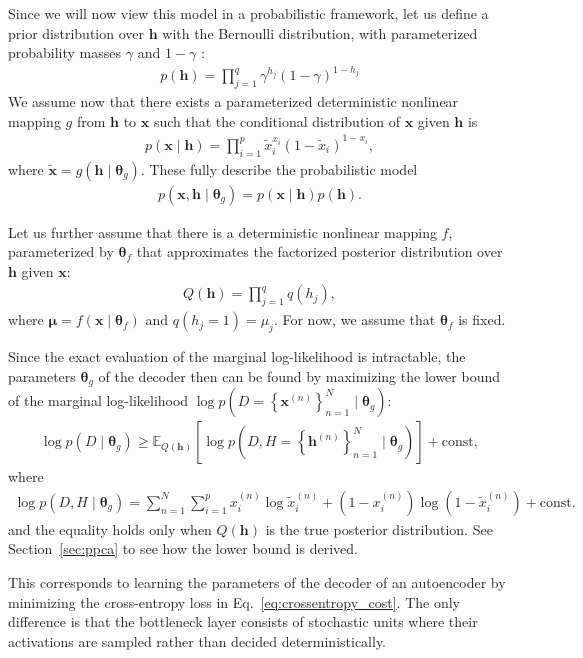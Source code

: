 \documentclass[dissertation,nocontribution]{aaltoseries}
\newcommand{\vect}[1]{\mathbf{#1}}
\newcommand{\vects}[1]{\boldsymbol{#1}}
\newcommand{\vh}[0]{\vect{h}}
\newcommand{\vx}[0]{\vect{x}}
\newcommand{\vmu}[0]{\vects{\mu}}
\newcommand{\TT}[0]{{\vects{\theta}}}
\newcommand{\E}[0]{\mathbb{E}}
\begin{document}
Since we will now view this model in a probabilistic
framework, let us define a prior distribution over $\vh$
with the
Bernoulli distribution, with parameterized probability masses
$\gamma$ and $1-\gamma$ :
\begin{align}
    \label{eq:ae_prior}
    p(\vh) = \prod_{j=1}^q \gamma^{h_j} (1 - \gamma)^{1 -
    h_j}
\end{align}
We assume now that there exists a parameterized
deterministic nonlinear mapping $g$ from $\vh$ to $\vx$ such
that the conditional distribution of $\vx$ given $\vh$ is
\begin{align}
    \label{eq:ae_cond}
    p(\vx \mid \vh) = \prod_{i=1}^p \tilde{x}_i^{x_i} (1 -
    \tilde{x}_i)^{1 - x_i},
\end{align}
where $\tilde{\vx} = g(\vh \mid \TT_g)$. These fully
describe the probabilistic model 
\begin{align}
    \label{eq:ae_full}
p(\vx, \vh \mid \TT_g) = p(\vx \mid \vh) p(\vh).
\end{align}

Let us further assume that there is a deterministic
nonlinear mapping $f$, parameterized by $\TT_f$ that
approximates the factorized posterior distribution over
$\vh$ given $\vx$:
\begin{align}
    \label{eq:ae_posterior}
    Q(\vh) = \prod_{j=1}^q q(h_j),
\end{align}
where $\vmu = f(\vx \mid \TT_f)$ and $q(h_j = 1) = \mu_j$.
For now, we assume that $\TT_f$ is fixed.

Since the exact evaluation of the marginal log-likelihood is
intractable, the parameters $\TT_g$ of the decoder then
can be found by maximizing the lower bound of the marginal
log-likelihood $\log p(D = \left\{ \vx^{(n)}
\right\}_{n=1}^N \mid \TT_g)$:
\begin{align*}
    \log p(D \mid \TT_g) \geq \E_{Q(\vh)} \left[ \log p\left(D,
    H=\left\{ \vh^{(n)} \right\}_{n=1}^N \mid \TT_g\right) \right] +
    \text{const},
\end{align*}
where 
\begin{align*}
    \log p(D, H \mid \TT_g) = \sum_{n=1}^N \sum_{i=1}^p
    x^{(n)}_i \log
    \tilde{x}^{(n)}_i + (1 - x^{(n)}_i) \log (1 -
    \tilde{x}^{(n)}_i) + \text{const}.
\end{align*}
and the equality holds only when $Q(\vh)$ is the true
posterior distribution. See Section~\ref{sec:ppca} to see
how the lower bound is derived.

This corresponds to learning the
parameters of the decoder of an autoencoder by minimizing
the cross-entropy loss in Eq.~\eqref{eq:crossentropy_cost}.
The only difference is that the bottleneck layer consists of
stochastic units where their activations are sampled
rather than decided deterministically. 
\end{document}
